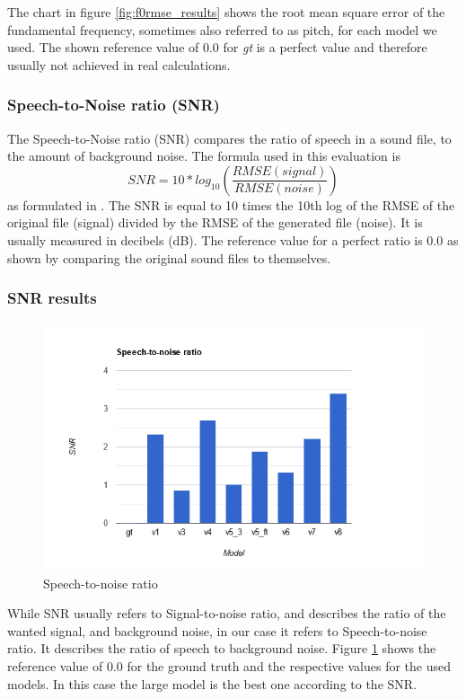 \documentclass[a4paper]{article}
\begin{document}
	The chart in figure \ref{fig:f0rmse_results} shows the root mean square error of
	the fundamental frequency, sometimes also referred to as pitch, for each model
	we used. The shown reference value of 0.0 for \emph{gt} is a perfect value and
	therefore usually not achieved in real calculations.
	
	\subsubsection{Speech-to-Noise ratio (SNR)}
	The Speech-to-Noise ratio (SNR) compares the ratio of speech in a sound file, to
	the amount of background noise. The formula used in this evaluation is \\
	\[
	SNR = 10*log_{10} (\frac{RMSE(signal)}{RMSE(noise)})
	\]
	as formulated in \cite{ji2020comprehensivesurveydeepmusic}. The SNR is equal to 10 times the 10th log of the RMSE of
	the original file (signal) divided by the RMSE of the generated file (noise). It
	is usually measured in decibels (dB). The reference value for a perfect ratio is
	0.0 as shown by comparing the original sound files to themselves.
	
	\subsubsection{SNR results}
	\begin{figure}[hbtp]
		\includegraphics[width=\textwidth]{evaluation/graphs/SNR.png}
		\caption{Speech-to-noise ratio}
		\label{fig:snr}
	\end{figure}
	
	While SNR usually refers to Signal-to-noise ratio, and describes the ratio of
	the wanted signal, and background noise, in our case it refers to
	Speech-to-noise ratio. It describes the ratio of speech to background noise.
	Figure \ref{fig:snr} shows the reference value of 0.0 for the ground truth and
	the respective values for the used models. In this case the large model is the
	best one according to the SNR.
	
\end{document}
